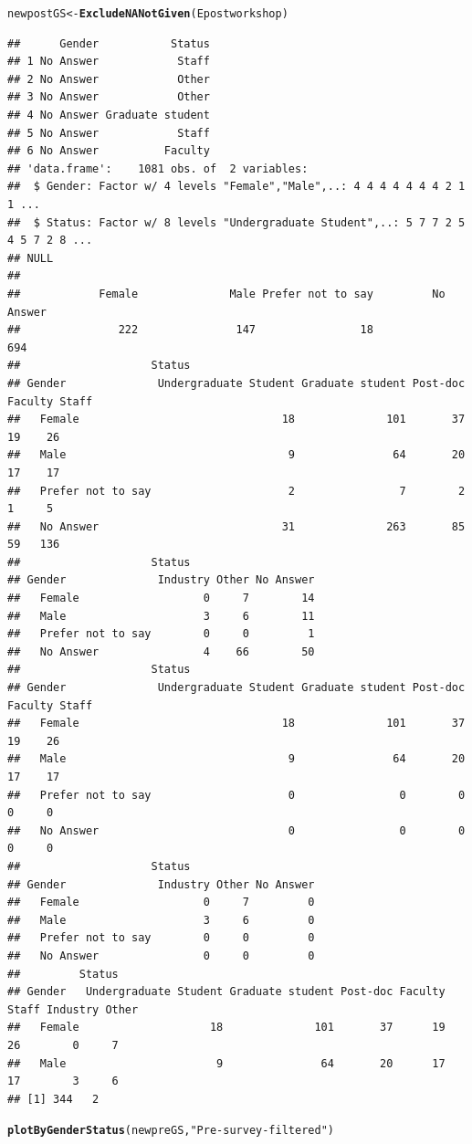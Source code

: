 \documentclass{article}\usepackage[]{graphicx}\usepackage[]{color}
\makeatletter
\newcommand{\hlstr}[1]{\textcolor[rgb]{0.192,0.494,0.8}{#1}}%
\newcommand{\hlstd}[1]{\textcolor[rgb]{0.345,0.345,0.345}{#1}}%
\newcommand{\hlkwb}[1]{\textcolor[rgb]{0.69,0.353,0.396}{#1}}%
\newcommand{\hlkwd}[1]{\textcolor[rgb]{0.737,0.353,0.396}{\textbf{#1}}}%
\newenvironment{kframe}{%
 \def\at@end@of@kframe{}%
 \ifinner\ifhmode%
  \def\at@end@of@kframe{\end{minipage}}%
  \begin{minipage}{\columnwidth}%
 \fi\fi%
 \def\FrameCommand##1{\hskip\@totalleftmargin \hskip-\fboxsep
 \colorbox{shadecolor}{##1}\hskip-\fboxsep
     \hskip-\linewidth \hskip-\@totalleftmargin \hskip\columnwidth}%
 \MakeFramed {\advance\hsize-\width
   \@totalleftmargin\z@ \linewidth\hsize
   \@setminipage}}%
 {\par\unskip\endMakeFramed%
 \at@end@of@kframe}
\newenvironment{knitrout}{}{} %
\makeatother
\begin{document}
\begin{knitrout}
\begin{kframe}
\begin{verbatim}
\end{verbatim}
\begin{alltt}
\hlstd{newpostGS} \hlkwb{<-} \hlkwd{ExcludeNANotGiven}\hlstd{(Epostworkshop)}
\end{alltt}
\begin{verbatim}
##      Gender           Status
## 1 No Answer            Staff
## 2 No Answer            Other
## 3 No Answer            Other
## 4 No Answer Graduate student
## 5 No Answer            Staff
## 6 No Answer          Faculty
## 'data.frame':	1081 obs. of  2 variables:
##  $ Gender: Factor w/ 4 levels "Female","Male",..: 4 4 4 4 4 4 4 2 1 1 ...
##  $ Status: Factor w/ 8 levels "Undergraduate Student",..: 5 7 7 2 5 4 5 7 2 8 ...
## NULL
## 
##            Female              Male Prefer not to say         No Answer 
##               222               147                18               694 
##                    Status
## Gender              Undergraduate Student Graduate student Post-doc Faculty Staff
##   Female                               18              101       37      19    26
##   Male                                  9               64       20      17    17
##   Prefer not to say                     2                7        2       1     5
##   No Answer                            31              263       85      59   136
##                    Status
## Gender              Industry Other No Answer
##   Female                   0     7        14
##   Male                     3     6        11
##   Prefer not to say        0     0         1
##   No Answer                4    66        50
##                    Status
## Gender              Undergraduate Student Graduate student Post-doc Faculty Staff
##   Female                               18              101       37      19    26
##   Male                                  9               64       20      17    17
##   Prefer not to say                     0                0        0       0     0
##   No Answer                             0                0        0       0     0
##                    Status
## Gender              Industry Other No Answer
##   Female                   0     7         0
##   Male                     3     6         0
##   Prefer not to say        0     0         0
##   No Answer                0     0         0
##         Status
## Gender   Undergraduate Student Graduate student Post-doc Faculty Staff Industry Other
##   Female                    18              101       37      19    26        0     7
##   Male                       9               64       20      17    17        3     6
## [1] 344   2
\end{verbatim}
\begin{alltt}
\hlkwd{plotByGenderStatus}\hlstd{(newpreGS,} \hlstr{"Pre-survey-filtered"}\hlstd{)}
\end{alltt}
\end{kframe}


\end{knitrout}
\end{document}
